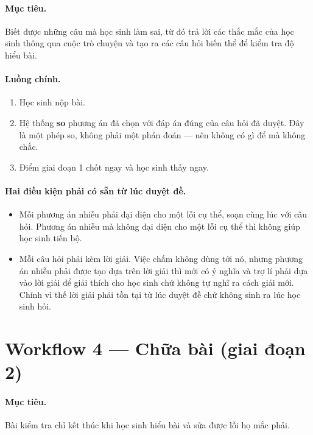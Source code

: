 \paragraph{Mục tiêu.} Biết được những câu mà học sinh làm sai, từ đó trả lời các thắc mắc của học sinh thông qua cuộc trò chuyện và 
tạo ra các câu hỏi biến thể để kiểm tra độ hiểu bài.

\paragraph{Luồng chính.}
\begin{enumerate}
  \item Học sinh nộp bài.
  \item Hệ thống \textbf{so} phương án đã chọn với đáp án đúng của câu hỏi đã duyệt. Đây là một
        phép so, không phải một phán đoán --- nên không có gì để mà không chắc.
  \item Điểm giai đoạn 1 chốt ngay và học sinh thấy ngay.
\end{enumerate}

\paragraph{Hai điều kiện phải có sẵn từ lúc duyệt đề.}
\begin{itemize}
  \item Mỗi phương án nhiễu phải đại diện cho một lỗi cụ thể, soạn cùng lúc với câu hỏi. Phương án
        nhiễu mà không đại diện cho một lỗi cụ thể thì không giúp học sinh tiến bộ.
  \item Mỗi câu hỏi phải kèm lời giải. Việc chấm không dùng tới nó, nhưng phương án nhiễu phải được tạo dựa trên lời giải thì mới có ý nghĩa
        và trợ lí phải dựa vào lời giải để giải thích cho học sinh chứ không tự nghĩ ra cách giải mới. Chính vì thế
        lời giải phải tồn tại từ lúc duyệt đề chứ không sinh ra lúc học sinh hỏi.
\end{itemize}

\section{Workflow 4 --- Chữa bài (giai đoạn 2)}

\paragraph{Mục tiêu.} Bài kiểm tra chỉ kết thúc khi học sinh hiểu bài và sửa được lỗi họ mắc phải.

